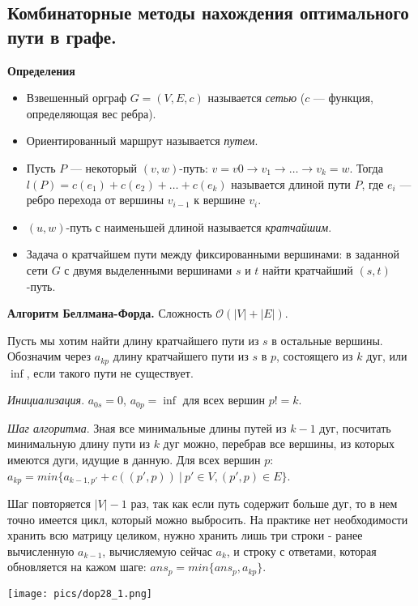 \subsection{Комбинаторные методы нахождения оптимального пути в графе.}

\textbf{Определения}

\begin{itemize}
    \item Взвешенный орграф $G = (V, E, c)$ называется \textit{сетью} ($c$ --- функция, определяющая вес ребра).
    \item Ориентированный маршрут называется \textit{путем}. 
    \item Пусть $P$ --- некоторый $(v, w)$-путь: $v = v 0 \rightarrow v_1 \rightarrow \dots \rightarrow v_k = w$. Тогда $l(P) = c(e_1) + c(e_2) + \dots + c(e_k)$ называется длиной пути $P$, где $e_i$ --- ребро перехода от вершины $v_{i-1}$ к вершине $v_i$. 
    \item $(u, w)$-путь с наименьшей длиной называется \textit{кратчайшим}.
    \item Задача о кратчайшем пути между фиксированными вершинами: в заданной сети $G$ с двумя выделенными вершинами $s$ и $t$ найти кратчайший $(s, t)$-путь.
\end{itemize}

\textbf{Алгоритм Беллмана-Форда.} 
Сложность $\mathcal{O}(|V| + |E|)$.

Пусть мы хотим найти длину кратчайшего пути из $s$ в остальные вершины. Обозначим через $a_{kp}$ длину кратчайшего пути из $s$ в $p$, состоящего из $k$ дуг, или $\inf$, если такого пути не существует.

\textit{Инициализация}. 
$a_{0s} = 0$, $a_{0p} = \inf$ для всех вершин $p != k$.

\textit{Шаг алгоритма}.
Зная все минимальные длины путей из $k-1$ дуг, посчитать минимальную длину пути из $k$ дуг можно, перебрав все вершины, из которых имеются дуги, идущие в данную. Для всех вершин $p$: $a_{kp} = min\{a_{k-1,p'} + c((p',p))~|~p' \in V, (p',p) \in E\}$. 

Шаг повторяется $|V| - 1$ раз, так как если путь содержит больше дуг, то в нем точно имеется цикл, который можно выбросить. На практике нет необходимости хранить всю матрицу целиком, нужно хранить лишь три строки - ранее вычисленную $a_{k-1}$, вычисляемую сейчас $a_k$, и строку с ответами, которая обновляется на кажом шаге: $ans_p = min\{ans_p, a_{kp}\}$.

\texttt{[image: pics/dop28\_1.png]}

